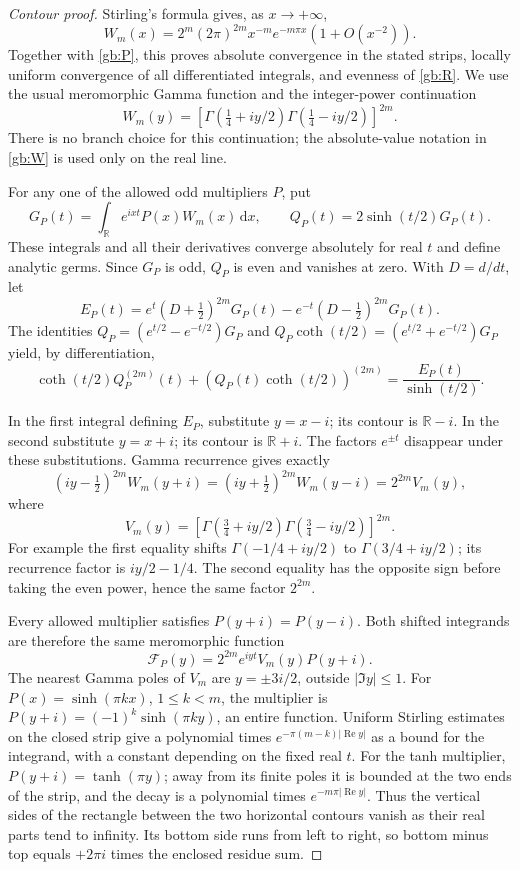 \documentclass[11pt,a4paper]{article}
\numberwithin{equation}{section}
\theoremstyle{definition}
\theoremstyle{remark}
\newcommand{\dd}{\,\mathrm d}
\newcommand{\Rea}{\operatorname{Re}}
\begin{document}
\begin{proof}[Contour proof]
Stirling's formula gives, as $x\to+\infty$,
\[
 W_m(x)=2^m(2\pi)^{2m}x^{-m}e^{-m\pi x}(1+O(x^{-2})).
\]
Together with \eqref{gb:P}, this proves absolute convergence in
the stated strips, locally uniform convergence of all differentiated
integrals, and evenness of \eqref{gb:R}.  We use the usual meromorphic
Gamma function and the integer-power continuation
\[
 W_m(y)=\left[
 \Gamma(\tfrac14+iy/2)\Gamma(\tfrac14-iy/2)\right]^{2m}.
\]
There is no branch choice for this continuation; the absolute-value
notation in \eqref{gb:W} is used only on the real line.

For any one of the allowed odd multipliers $P$, put
\[
 G_P(t)=\int_{\mathbb R}e^{ixt}P(x)W_m(x)\dd x,
 \qquad Q_P(t)=2\sinh(t/2)G_P(t).
\]
These integrals and all their derivatives converge absolutely for
real $t$ and define analytic germs.  Since $G_P$ is odd, $Q_P$ is
even and vanishes at zero.  With $D=d/dt$, let
\[
 E_P(t)=e^t(D+\tfrac12)^{2m}G_P(t)
                 -e^{-t}(D-\tfrac12)^{2m}G_P(t).
\]
The identities $Q_P=(e^{t/2}-e^{-t/2})G_P$ and
$Q_P\coth(t/2)=(e^{t/2}+e^{-t/2})G_P$ yield, by differentiation,
\begin{equation}\label{gb:contour-algebra}
 \coth(t/2)Q_P^{(2m)}(t)
       +(Q_P(t)\coth(t/2))^{(2m)}
                    =\frac{E_P(t)}{\sinh(t/2)}.
\end{equation}

In the first integral defining $E_P$, substitute $y=x-i$;
its contour is $\mathbb R-i$.  In the second substitute $y=x+i$;
its contour is $\mathbb R+i$.  The factors $e^{\pm t}$ disappear
under these substitutions.  Gamma recurrence gives exactly
\begin{equation}\label{gb:gamma-cancellation}
 (iy-\tfrac12)^{2m}W_m(y+i)
 =(iy+\tfrac12)^{2m}W_m(y-i)=2^{2m}V_m(y),
\end{equation}
where
\[
 V_m(y)=\left[
 \Gamma(\tfrac34+iy/2)\Gamma(\tfrac34-iy/2)\right]^{2m}.
\]
For example the first equality shifts
$\Gamma(-1/4+iy/2)$ to $\Gamma(3/4+iy/2)$; its recurrence
factor is $iy/2-1/4$.  The second equality has the opposite sign
before taking the even power, hence the same factor $2^{2m}$.

Every allowed multiplier satisfies $P(y+i)=P(y-i)$.  Both shifted
integrands are therefore the same meromorphic function
\[
 \mathcal F_P(y)=2^{2m}e^{iyt}V_m(y)P(y+i).
\]
The nearest Gamma poles of $V_m$ are $y=\pm3i/2$, outside
$|\Im y|\le1$.  For $P(x)=\sinh(\pi kx)$, $1\le k<m$,
the multiplier is $P(y+i)=(-1)^k\sinh(\pi ky)$, an entire
function.  Uniform Stirling estimates on the closed strip give
a polynomial times $e^{-\pi(m-k)|\Rea y|}$ as a bound for the
integrand, with a constant depending on the fixed real $t$.
For the tanh multiplier, $P(y+i)=\tanh(\pi y)$; away from its
finite poles it is bounded at the two ends of the strip, and
the decay is a polynomial times $e^{-m\pi|\Rea y|}$.
Thus the vertical sides of the rectangle between the two horizontal
contours vanish as their real parts tend to infinity.  Its bottom
side runs from left to right, so bottom minus top equals
$+2\pi i$ times the enclosed residue sum.


\end{proof}
\end{document}

